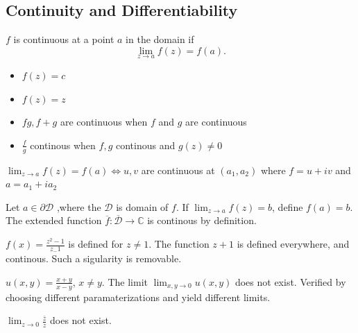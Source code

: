
\subsection{Continuity and Differentiability}

\begin{definition}[Continuity]
	$f$ is continuous at a point $a$ in the domain if \[
	\lim_{z \to a} f(z) = f(a)
	.\] 
\end{definition}

\begin{example}
	\quad
	\begin{itemize}
		\item $f(z) = c$ 
		\item $f(z) = z$
		\item  $fg, f+g$ are continuous when $f$ and $g$ are continuous
		\item $\frac{f}{g}$ continous when $f, g$ continous and $g(z) \neq  0$

	\end{itemize}
	
\end{example}

\begin{proposition}
	 
	$\lim_{z \to a} f(z) = f(a)  \iff u, v$ are continuous at $(a_1, a_2)$ where $f = u + iv $ and $a = a_1 + i a_2$	
\end{proposition}

Let $a \in \partial \mathcal{D}$ ,where the $\mathcal{D}$ is domain of $f$. If $\lim_{z \to a} f(z)= b$, define $f(a) = b$. The extended function $\overline{f} : \overline{\mathcal{D}} \to \mathbb{C}$ is continous by definition.

\begin{example}
	$f(x) = \frac{z^2 - 1}{z_-1}$ is defined for $z \neq  1$. The function $z+1$ is defined everywhere, and continous. Such a sigularity is removable.
\end{example}
\begin{example}
	$u(x,y) = \frac{x+y}{x-y}$, $x \neq y$. The limit $\lim_{x,y \to 0} u(x,y)$ does not exist. Verified by choosing different paramaterizations and yield different limits.

	$\lim_{z \to 0} \frac{\overline{z} }{z}$ does not exist.
\end{example}

